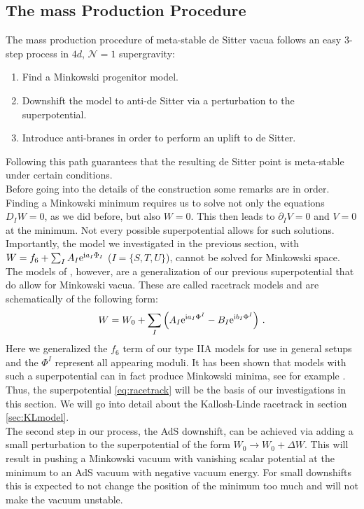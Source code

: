 \documentclass[a4paper,12pt]{report}
\newcommand{\be}{\begin{equation}}
\newcommand{\ee}{\end{equation}}
\def\rmi{{\rm i}}
\def\rme{{\rm e}}
\begin{document}
\subsection{The mass Production Procedure}
The mass production procedure of meta-stable de Sitter vacua follows an easy 3-step process in $4d$, $\mathcal{N}=1$ supergravity:
\begin{enumerate}
\item Find a Minkowski progenitor model.
\item Downshift the model to anti-de Sitter via a perturbation to the superpotential.
\item Introduce anti-branes in order to perform an uplift to de Sitter.
\end{enumerate}
Following this path guarantees that the resulting de Sitter point is meta-stable under certain conditions.\\
Before going into the details of the construction some remarks are in order. Finding a Minkowski minimum requires us to solve not only the equations $D_I W =0$, as we did before, but also $W=0$. This then leads to $\partial_I V=0$ and $V=0$ at the minimum. Not every possible superpotential allows for such solutions. Importantly, the model we investigated in the previous section, with $W = f_6 + \sum_I A_I \rme^{\rmi a_I \Phi_I}$ ($I = \{S,T,U\}$), cannot be  solved for Minkowski space. The models of \cite{Kallosh:2004yh,BlancoPillado:2005fn,Kallosh:2011qk}, however, are a generalization of our previous superpotential that do allow for Minkowski vacua. These are called racetrack models and are schematically of the following form:
\be 
W = W_0 + \sum_I \left( A_I \rme^{\rmi a_I  \Phi^I} - B_I \rme^{\rmi b_I  \Phi^I}\right)\,.
\label{eq:racetrack}
\ee
Here we generalized the $f_6$ term of our type IIA models for use in general setups and the $\Phi^I$ represent all appearing moduli. It has been shown that models with such a superpotential can in fact produce Minkowski minima, see for example \cite{Kallosh:2019zgd,Kallosh:2004yh}. Thus, the superpotential \eqref{eq:racetrack} will be the basis of our investigations in this section. We will go into detail about the Kallosh-Linde racetrack in section \ref{sec:KLmodel}.\\
The second step in our process, the AdS downshift, can be achieved via adding a small perturbation to the superpotential of the form $W_0 \to W_0 + \Delta W$. This will result in pushing a Minkowski vacuum with vanishing scalar potential at the minimum to an AdS vacuum with negative vacuum energy. For small downshifts this is expected to not change the position of the minimum too much and will not make the vacuum unstable.\\
\end{document}
